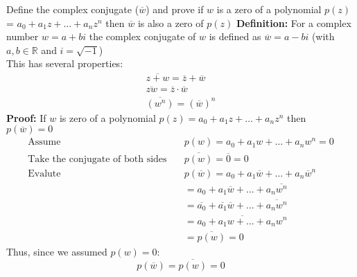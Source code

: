 \documentclass[a4paper, 8pt]{extarticle}
\begin{document}
\begin{examplebox}{Define the complex conjugate ($\overline{w}$) and prove if $w$ is a zero of a polynomial $p(z)$ = $a_0 + a_1 z + \ldots + a_n z^n$ then $\overline{w}$ is also a zero of $p(z)$}{}
	\label{sol:2021Q1b}
	\textbf{Definition:} For a complex number $w = a+bi$ the complex conjugate of $w$ is defined as $\overline{w} = a - bi$ (with $a,b \in \mathbb{R}$ and $i = \sqrt{-1}$)\\
	This has several properties:
	\begin{align*}
		\overline{z+w} = \overline{z} + \overline{w}    \\
		\overline{zw} = \overline{z} \cdot \overline{w} \\
		\overline{(w^n)} = \left(\overline{w}\right)^n
	\end{align*}
	\textbf{Proof:} If $w$ is zero of a polynomial $p(z) = a_0 + a_1 z + \ldots + a_n z^n$ then $p(\overline{w}) = 0$
	\begin{align*}
		\text{Assume} \quad                           & p(w) = a_0 + a_1 w + \ldots + a_n w^n = 0                                    \\
		\text{Take the conjugate of both sides} \quad & \overline{p(w)} = \overline{0} = 0                                           \\
		\text{Evalute} \quad                          & p(\overline{w}) = a_0 + a_1 \overline{w} + \ldots + a_n \overline{w}^n       \\
		                                              & = a_0 + a_1 \overline{w} + \ldots + a_n \overline{w^n}                       \\
		                                              & = \overline{a_0} + \overline{a_1} \overline{w} + \ldots + \overline{a_n w^n} \\
		                                              & = \overline{a_0 + a_1 w + \ldots + a_n w^n}                                  \\
		                                              & = \overline{p(w)} = 0
	\end{align*}
	Thus, since we assumed $p(w) = 0$:
	$$p(\overline{w}) = \overline{p(w)} = 0$$
\end{examplebox}
\end{document}
